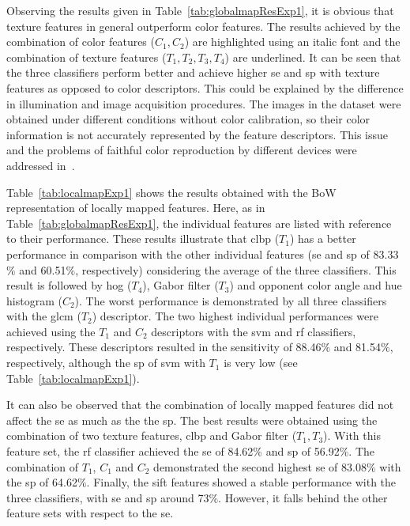 Observing the results given in Table~\ref{tab:globalmapResExp1}, it is obvious that texture features in general outperform color features. 
The results achieved by the combination of color features ($C_{1}, C_{2}$) are highlighted using an italic font and the combination of texture features ($T_{1},T_{2},T_{3},T_{4}$) are underlined. 
It can be seen that the three classifiers perform better and achieve higher \ac{se} and \ac{sp} with texture features as opposed to color descriptors. 
This could be explained by the difference in illumination and image acquisition procedures. 
The images in the dataset were obtained under different conditions without color calibration, so their color information is not accurately represented by the feature descriptors. 
This issue and the problems of faithful color reproduction by different devices were addressed in~\cite{Quintana2011,iyatomi2011automated,gomez2008independent,schaefer2011colour,6866131}.

Table~\ref{tab:localmapExp1} shows the results obtained with the BoW representation of locally mapped features.
Here, as in Table~\ref{tab:globalmapResExp1}, the individual features are listed with reference to their performance.
These results illustrate that \ac{clbp} ($T_{1}$) has a better performance in comparison with the other individual features (\ac{se} and \ac{sp} of 83.33$\%$ and 60.51$\%$, respectively) considering the average of the three classifiers. 
This result is followed by \ac{hog} ($T_{4}$), Gabor filter ($T_{3}$) and opponent color angle and hue histogram ($C_{2}$). 
The worst performance is demonstrated by all three classifiers with the \ac{glcm} ($T_{2}$) descriptor. 
The two highest individual performances were achieved using the $T_{1}$ and $C_{2}$ descriptors with the \ac{svm} and \ac{rf} classifiers, respectively. 
These descriptors resulted in the sensitivity of 88.46$\%$ and 81.54$\%$, respectively, although the \ac{sp} of \ac{svm} with $T_{1}$ is very low (see Table~\ref{tab:localmapExp1}).

It can also be observed that the combination of locally mapped features did not affect the \ac{se} as much as the the \ac{sp}.
The best results were obtained using the combination of two texture features, \ac{clbp} and Gabor filter ($T_{1}, T_{3}$).
With this feature set, the \ac{rf} classifier achieved the \ac{se} of 84.62$\%$ and \ac{sp} of 56.92$\%$. 
The combination of $T_{1}$, $C_{1}$ and $C_{2}$ demonstrated the second highest \ac{se} of 83.08$\%$ with the \ac{sp} of 64.62$\%$.
Finally, the \ac{sift} features showed a stable performance with the three classifiers, with \ac{se} and \ac{sp} around 73$\%$. 
However, it falls behind the other feature sets with respect to the \ac{se}.

